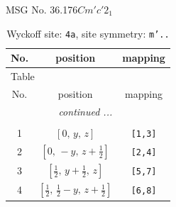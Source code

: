 \documentclass[fleqn,8pt]{jsarticle}
\begin{document}
\setcounter{MaxMatrixCols}{32}

\renewcommand{\tablename}{Table~}
\renewcommand{\figurename}{Figure~}
\begin{center}
\LARGE
MSG No. 36.176\quad$Cm'c'2_{1}$
\end{center}
\renewcommand{\arraystretch}{1.2}
\begin{longtable}{ccc}
\caption{Wyckoff site: {\tt 4a}, site symmetry: {\tt m'..}}
 \\
 \hline \hline
No. & position & mapping \\ \hline \endfirsthead

\multicolumn{2}{l}{\tablename\ \thetable{}} \\
 \hline \hline
No. & position & mapping \\ \hline \endhead

 \hline \hline
\multicolumn{2}{r}{\footnotesize\it continued ...} \\ \endfoot

 \hline \hline
\multicolumn{2}{r}{} \\ \endlastfoot

1 & $\left[ 0,\, y,\, z \right]$ & {\tt [1,3]} \\ \hline
2 & $\left[ 0,\, - y,\, z + \frac{1}{2} \right]$ & {\tt [2,4]} \\ \hline
3 & $\left[ \frac{1}{2},\, y + \frac{1}{2},\, z \right]$ & {\tt [5,7]} \\ \hline
4 & $\left[ \frac{1}{2},\, \frac{1}{2} - y,\, z + \frac{1}{2} \right]$ & {\tt [6,8]} \\
\end{longtable}
\renewcommand{\arraystretch}{1.2}
\end{document}
